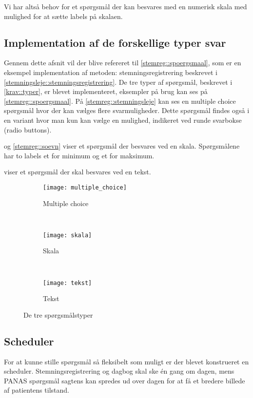 Vi har altså behov for et spørgsmål der kan besvares med en numerisk skala med mulighed for at sætte labels på skalaen.

\subsection{Implementation af de forskellige typer svar}
Gennem dette afsnit vil der blive refereret til \cref{stemreg::spoergsmaal}, som er en eksempel implementation af metoden: stemningsregistrering beskrevet i \cref{stemningsleje::stemningsregistrering}.
De tre typer af spørgsmål, beskrevet i \cref{krav::typer}, er blevet implementeret, eksempler på brug kan ses på \cref{stemreg::spoergsmaal}.
På \cref{stemreg::stemningsleje} kan ses en multiple choice spørgsmål hvor der kan vælges flere svarmuligheder.
Dette spørgsmål findes også i en variant hvor man kun kan vælge en mulighed, indikeret ved runde svarbokse (radio buttons).

 og \cref{stemreg::soevn} viser et spørgsmål der besvares ved en skala. 
Spørgsmålene har to labels et for minimum og et for maksimum.

 viser et spørgsmål der skal besvares ved en tekst. 


\begin{figure}
	\centering
	\begin{subfigure}[b]{0.3\textwidth}
		\texttt{[image: multiple\_choice]}
		\caption{Multiple choice}\label{multi}
	\end{subfigure}
	~
	\begin{subfigure}[b]{0.3\textwidth}
		\texttt{[image: skala]}
		\caption{Skala}\label{skala}
	\end{subfigure}
	~
	\begin{subfigure}[b]{0.3\textwidth}
		\texttt{[image: tekst]}
		\caption{Tekst}\label{tekst}
	\end{subfigure}
	\caption{De tre spørgsmålstyper}\label{sporgsmål}
\end{figure}

\subsection{Scheduler}
For at kunne stille spørgsmål så fleksibelt som muligt er der blevet konstrueret en scheduler.
Stemningsregistrering og dagbog skal ske én gang om dagen, mens PANAS spørgsmål sagtens kan spredes ud over dagen for at få et bredere billede af patientens tilstand.


